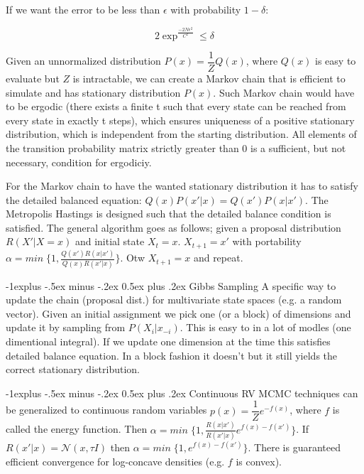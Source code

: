 \documentclass[a4paper, 11pt, twoside, landscape]{article}
\makeatletter
\renewcommand{\subsection}{\@startsection{subsection}{2}{0mm}%
                                {-1explus -.5ex minus -.2ex}%
                                {0.5ex plus .2ex}%
                                {\normalfont\normalsize\bfseries}}
\makeatother
\begin{document}
\begin{multicols}{3}
If we want the error to be less than $\epsilon$ with probability $1 - \delta$:

$$
2\exp^{\frac{-2N\epsilon^2}{C^2}} \leq \delta 
$$

Given an unnormalized distribution $P(x) = \dfrac{1}{Z} Q(x)$, where $Q(x)$ is easy to evaluate but $Z$ is intractable, we can create a Markov chain that is efficient to simulate and has stationary distribution $P(x)$. Such Markov chain would have to be ergodic (there exists a finite t such that every state can be reached from every state in exactly t steps), which ensures uniqueness of a positive stationary distribution, which is independent from the starting distribution. All elements of the transition probability matrix strictly greater than 0 is a sufficient, but not necessary, condition for ergodiciy.

For the Markov chain to have the wanted stationary distribution it has to satisfy the detailed balanced equation: $Q(x)P(x'|x) = Q(x')P(x|x')$. The Metropolis Hastings is designed such that the detailed balance condition is satisfied. The general algorithm goes as follows; given a proposal distribution $R(X'|X=x)$ and initial state $X_t = x$. $X_{t+1} = x'$ with portability $\alpha = min \; \big\{1, \frac{Q(x')R(x|x')}{Q(x)R(x'|x)} \big\}$. Otw $X_{t+1}= x$ and repeat.

\subsection{Gibbs Sampling}
A specific way to update the chain (proposal dist.) for multivariate state spaces (e.g. a random vector). Given an initial assignment we pick one (or a block) of dimensions and update it by sampling from $P(X_i|x_{-i})$. This is easy to  in a lot of modles (one dimentional integral).  If we update one dimension at the time this satisfies detailed balance equation. In a block fashion it doesn't but it still yields the correct stationary distribution.

\subsection{Continuous RV}
MCMC techniques can be generalized to continuous random variables $p(x) = \dfrac{1}{Z} e^{-f(x)}$, where $f$ is called the energy function. Then $\alpha = min \; \big\{1, \frac{R(x|x')}{R(x'|x)} e^{f(x)-f(x')} \big\}$. If $R(x'|x) = \mathcal{N}(x, \tau I)$ then $\alpha = min \; \big\{1, e^{f(x)-f(x')} \big\}$. There is guaranteed efficient convergence for log-concave densities (e.g. $f$ is convex).


\end{multicols}
\end{document}
